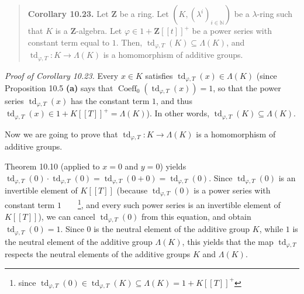 \documentclass[numbers=enddot,12pt,final,onecolumn,notitlepage]{scrartcl}%
\begin{document}
\begin{quote}
\textbf{Corollary 10.23.} Let $\mathbf{Z}$ be a ring. Let $\left(  K,\left(
\lambda^{i}\right)  _{i\in\mathbb{N}}\right)  $ be a $\lambda$-ring such that
$K$ is a $\mathbf{Z}$-algebra. Let $\varphi\in1+\mathbf{Z}\left[  \left[
t\right]  \right]  ^{+}$ be a power series with constant term equal to $1$.
Then, $\operatorname*{td}_{\varphi,T}\left(  K\right)  \subseteq\Lambda\left(
K\right)  $, and $\operatorname*{td}_{\varphi,T}:K\rightarrow\Lambda\left(
K\right)  $ is a homomorphism of additive groups.
\end{quote}

\textit{Proof of Corollary 10.23.} Every $x\in K$ satisfies
$\operatorname*{td}_{\varphi,T}\left(  x\right)  \in\Lambda\left(  K\right)  $
(since Proposition 10.5 \textbf{(a)} says that $\operatorname*{Coeff}%
\nolimits_{0}\left(  \operatorname*{td}_{\varphi,T}\left(  x\right)  \right)
=1$, so that the power series $\operatorname*{td}_{\varphi,T}\left(  x\right)
$ has the constant term $1$, and thus $\operatorname*{td}_{\varphi,T}\left(
x\right)  \in1+K\left[  \left[  T\right]  \right]  ^{+}=\Lambda\left(
K\right)  $). In other words, $\operatorname*{td}_{\varphi,T}\left(  K\right)
\subseteq\Lambda\left(  K\right)  $.

Now we are going to prove that $\operatorname*{td}_{\varphi,T}:K\rightarrow
\Lambda\left(  K\right)  $ is a homomorphism of additive groups.

Theorem 10.10 (applied to $x=0$ and $y=0$) yields $\operatorname*{td}%
\nolimits_{\varphi,T}\left(  0\right)  \cdot\operatorname*{td}%
\nolimits_{\varphi,T}\left(  0\right)  =\operatorname*{td}\nolimits_{\varphi
,T}\left(  0+0\right)  =\operatorname*{td}\nolimits_{\varphi,T}\left(
0\right)  $. Since $\operatorname*{td}\nolimits_{\varphi,T}\left(  0\right)  $
is an invertible element of $K\left[  \left[  T\right]  \right]  $ (because
$\operatorname*{td}\nolimits_{\varphi,T}\left(  0\right)  $ is a power series
with constant term $1$\ \ \ \ \footnote{since $\operatorname*{td}%
\nolimits_{\varphi,T}\left(  0\right)  \in\operatorname*{td}\nolimits_{\varphi
,T}\left(  K\right)  \subseteq\Lambda\left(  K\right)  =1+K\left[  \left[
T\right]  \right]  ^{+}$}, and every such power series is an invertible
element of $K\left[  \left[  T\right]  \right]  $), we can cancel
$\operatorname*{td}\nolimits_{\varphi,T}\left(  0\right)  $ from this
equation, and obtain $\operatorname*{td}\nolimits_{\varphi,T}\left(  0\right)
=1$. Since $0$ is the neutral element of the additive group $K$, while $1$ is
the neutral element of the additive group $\Lambda\left(  K\right)  $, this
yields that the map $\operatorname*{td}\nolimits_{\varphi,T}$ respects the
neutral elements of the additive groups $K$ and $\Lambda\left(  K\right)  $.
\end{document}
